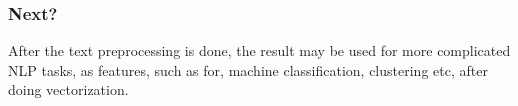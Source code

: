 \begin{frame}[fragile]
\frametitle{Next?}
 After the text preprocessing is done, the result may be used for more complicated NLP tasks, as features, such as for, machine classification, clustering etc, after doing vectorization.
\end{frame}